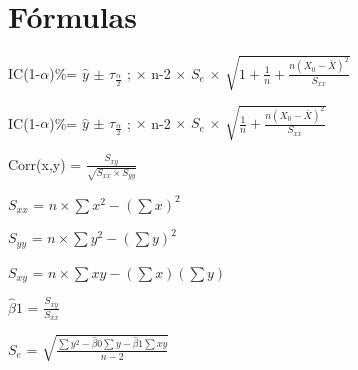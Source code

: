 \section*{\centering Fórmulas}

\begin{center}
    IC(1-$\alpha$)\%= $\hat{y}$ $\pm$ $\tau_\frac{\alpha}{2}$ ; $\times$ n-2 $\times$ $S_e$ $\times$  $\sqrt{1 + \frac{1}{n} + \frac{n(X_0 - \bar{X})^2}{S_{xx}}}$

    IC(1-$\alpha$)\%= $\hat{y}$ $\pm$ $\tau_\frac{\alpha}{2}$ ; $\times$ n-2 $\times$ $S_e$ $\times$  $\sqrt{\frac{1}{n} + \frac{n(X_0 - \bar{X})^2}{S_{xx}}}$

    Corr(x,y) = $\frac{S_{xy}}{\sqrt{S_{xx} \times S_{yy}}}$

    $S_{xx}$ = $n \times \sum x^2 - (\sum x)^2$

    $S_{yy}$ = $n \times \sum y^2 - (\sum y)^2$

    $S_{xy}$ = $n \times \sum xy - (\sum x)(\sum y)$

    $\hat{\beta}1$ = $\frac{S_{xy}}{S_{xx}}$

    $S_e$ = $\sqrt{\frac{\sum y^2 - \hat{\beta}0 \sum y - \hat{\beta}1 \sum xy}{n-2}}$

\end{center}